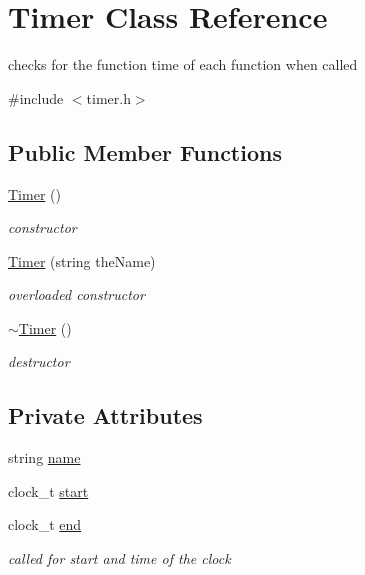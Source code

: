 \hypertarget{class_timer}{}\section{Timer Class Reference}
\label{class_timer}


checks for the function time of each function when called  




{\ttfamily \#include $<$timer.\+h$>$}

\subsection*{Public Member Functions}
\begin{DoxyCompactItemize}
\item 
\hyperlink{class_timer_a5f16e8da27d2a5a5242dead46de05d97}{Timer} ()
\begin{DoxyCompactList}\small\item\em constructor \end{DoxyCompactList}\item 
\hyperlink{class_timer_a0faa0537ddf1918baa13d64cc64fe1e9}{Timer} (string the\+Name)
\begin{DoxyCompactList}\small\item\em overloaded constructor \end{DoxyCompactList}\item 
\hyperlink{class_timer_a14fa469c4c295c5fa6e66a4ad1092146}{$\sim$\+Timer} ()
\begin{DoxyCompactList}\small\item\em destructor \end{DoxyCompactList}\end{DoxyCompactItemize}
\subsection*{Private Attributes}
\begin{DoxyCompactItemize}
\item 
string \hyperlink{class_timer_a2ef4db004f703c3225be0b837a159f85}{name}
\item 
clock\+\_\+t \hyperlink{class_timer_a4afa1d4272a81f139af97a6d521079d4}{start}
\item 
clock\+\_\+t \hyperlink{class_timer_ab433af761e99696b79826ec49bcd6bb8}{end}
\begin{DoxyCompactList}\small\item\em called for start and time of the clock \end{DoxyCompactList}\end{DoxyCompactItemize}


